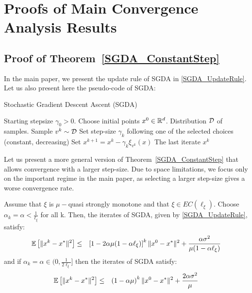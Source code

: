 \documentclass{article}
\begin{document}
\section{Proofs of Main Convergence Analysis Results}
\label{AppendixProofs}

\subsection{Proof of Theorem~\ref{SGDA_ConstantStep}}
\label{ProofSGDA_ConstantStep}
In the main paper, we present the update rule of SGDA in \eqref{SGDA_UpdateRule}. Let us also present here the pseudo-code of SGDA:
\begin{algorithm}[H]%
   \caption{Stochastic Gradient Descent Ascent (SGDA)}
   \label{SGDA_Algorithm}
\begin{algorithmic}
   Starting stepsize $\gamma_0>0$. Choose initial points $x^0 \in \mathbb{R}^d$. Distribution ${\cal D}$ of samples.
   \STATE Sample $v^k \sim {\cal D}$
   \STATE Set step-size $\gamma_k$ following one of the selected choices (constant, decreasing)
   \STATE Set $x^{k+1}=x^k -\gamma_k \xi_{v^k} (x)$
   \ENDFOR
     The last iterate $x^k$
\end{algorithmic}
\end{algorithm}

Let us present a more general version of Theorem~\ref{SGDA_ConstantStep} that allows convergence with a larger step-size. Due to space limitations, we focus only on the important regime in the main paper, as selecting a larger step-size gives a worse convergence rate. 
\begin{theorem}
\label{Appendix_SGDA_ConstantStep}
Assume that $\xi$ is $\mu-$quasi strongly monotone and that $\xi \in EC( \ell_{\xi})$. Choose $\alpha_k=\alpha < \frac{1}{\ell_\xi}$ for all k. Then, the iterates of SGDA, given by \eqref{SGDA_UpdateRule}, satisfy:
\begin{eqnarray}
\mathbb{E} \left[ \|x^{k}-x^*\|^2 \right]&\leq& \left[1-2\alpha \mu(1- \alpha \ell_\xi) \right]^k \|x^0-x^*\|^2  + \frac{\alpha \sigma^2}{ \mu (1-\alpha \ell_\xi)}
\end{eqnarray}
and if $\alpha_k=\alpha \in (0, \frac{1}{2\ell_\xi}]$ then the iterates of SGDA satisfy:
\begin{eqnarray}
\mathbb{E} \left[ \|x^{k}-x^*\|^2 \right]&\leq& \left(1-\alpha \mu \right)^k \|x^0-x^*\|^2  + \frac{2 \alpha \sigma^2}{ \mu}
\end{eqnarray}
\end{theorem}
\end{document}
